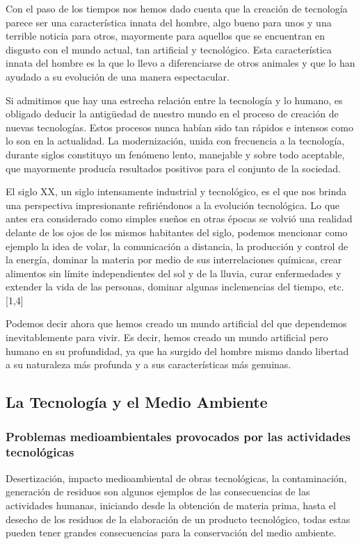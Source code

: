 \documentclass{bmcart}
\begin{document}
Con el paso de los tiempos nos hemos dado cuenta que la creación de tecnología parece ser una característica innata del hombre, algo bueno para unos y una terrible noticia para otros, mayormente para aquellos que se encuentran en disgusto con el mundo actual, tan artificial y tecnológico. Esta característica innata del hombre es la que lo llevo a diferenciarse de otros animales y que lo han ayudado a su evolución de una manera espectacular.\smallskip

Si admitimos que hay una estrecha relación entre la tecnología y lo humano, es obligado deducir la antigüedad de nuestro mundo en el proceso de creación de nuevas tecnologías. Estos procesos nunca habían sido tan rápidos e intensos como lo son en la actualidad. La modernización, unida con frecuencia a la tecnología, durante siglos constituyo un fenómeno lento, manejable y sobre todo aceptable, que mayormente producía resultados positivos para el conjunto de la sociedad.\smallskip

El siglo XX, un siglo intensamente industrial y tecnológico, es el que nos brinda una perspectiva impresionante refiriéndonos a la evolución tecnológica. Lo que antes era considerado como simples sueños en otras épocas se volvió una realidad delante de los ojos de los mismos habitantes del siglo, podemos mencionar como ejemplo la idea de volar, la comunicación a distancia, la producción y control de la energía, dominar la materia por medio de sus interrelaciones químicas, crear alimentos sin límite independientes del sol y de la lluvia, curar enfermedades y extender la vida de las personas, dominar algunas inclemencias del tiempo, etc. [1,4]\smallskip

Podemos decir ahora que hemos creado un mundo artificial del que dependemos inevitablemente para vivir. Es decir, hemos creado un mundo artificial pero humano en su profundidad, ya que ha surgido del hombre mismo dando libertad a su naturaleza más profunda y a sus características más genuinas.\smallskip


\subsection*{La Tecnología y el Medio Ambiente}
\smallskip
\subsubsection*{Problemas medioambientales provocados por las actividades tecnológicas}
Desertización, impacto medioambiental de obras tecnológicas, la contaminación, generación de residuos son algunos ejemplos de las consecuencias de las actividades humanas, iniciando desde la obtención de materia prima, hasta el desecho de los residuos de la elaboración de un producto tecnológico, todas estas pueden tener grandes consecuencias para la conservación del medio ambiente.\smallskip
\end{document}
